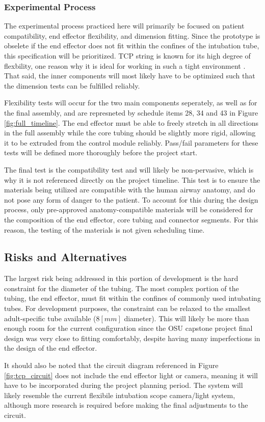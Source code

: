 	\subsubsection{Experimental Process}
	
		The experimental process practiced here will primarily be focused on patient compatibility, end effector flexibility, and dimension fitting. Since the prototype is obselete if the end effector does not fit within the confines of the intubation tube, this specification will be prioritized. TCP string is known for its high degree of flexbility, one reason why it is ideal for working in such a tight environment \cite{haines_new_2016}. That said, the inner components will most likely have to be optimized such that the dimension tests can be fulfilled reliably.
		
		Flexibility tests will occur for the two main components seperately, as well as for the final assembly, and are represneted by schedule items 28, 34 and 43 in Figure \ref{fig:full_timeline}. The end effector must be able to freely stretch in all directions in the full assembly while the core tubing should be slightly more rigid, allowing it to be extruded from the control module reliably. Pass/fail parameters for these tests will be defined more thoroughly before the project start.
		
		The final test is the compatibility test and will likely be non-pervasive, which is why it is not referenced directly on the project timeline. This test is to ensure the materials being utilized are compatible with the human airway anatomy, and do not pose any form of danger to the patient. To account for this during the design process, only pre-approved anatomy-compatible materials will be considered for the composition of the end effector, core tubing and connector segments. For this reason, the testing of the materials is not given scheduling time.

\subsection{Risks and Alternatives}

	The largest risk being addressed in this portion of development is the hard constraint for the diameter of the tubing. The most complex portion of the tubing, the end effector, must fit within the confines of commonly used intubating tubes. For development purposes, the constraint can be relaxed to the smallest adult-specific tube available ($8[mm]$ diameter). This will likely be more than enough room for the current configuration since the OSU capstone project final design was very close to fitting comfortably, despite having many imperfections in the design of the end effector.
	
	It should also be noted that the circuit diagram referenced in Figure \ref{fig:tcp_circuit} does not include the end effector light or camera, meaning it will have to be incorporated during the project planning period. The system will likely resemble the current flexibile intubation scope camera/light system, although more research is required before making the final adjustments to the circuit.